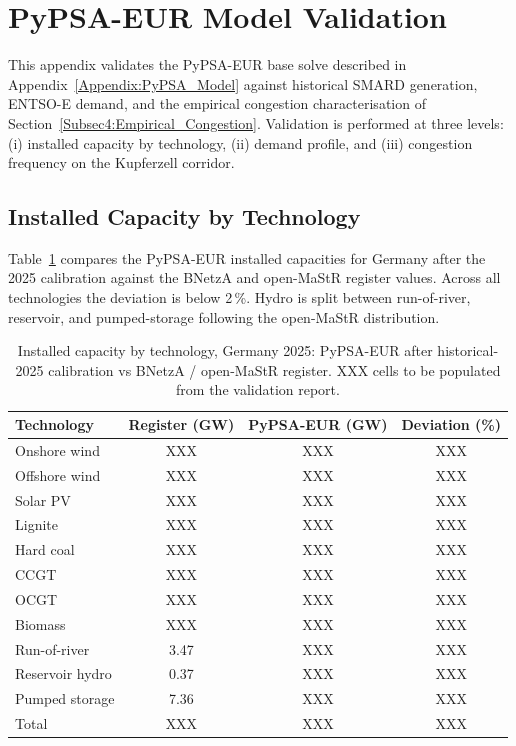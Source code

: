 \section{PyPSA-EUR Model Validation}\label{Appendix:PyPSA_Validation}

This appendix validates the PyPSA-EUR base solve described in Appendix~\ref{Appendix:PyPSA_Model} against historical SMARD generation, ENTSO-E demand, and the empirical congestion characterisation of Section~\ref{Subsec4:Empirical_Congestion}. Validation is performed at three levels: (i) installed capacity by technology, (ii) demand profile, and (iii) congestion frequency on the Kupferzell corridor.

\subsection{Installed Capacity by Technology}

Table~\ref{Tab:Capacity_Validation} compares the PyPSA-EUR installed capacities for Germany after the 2025 calibration against the BNetzA \citep{Bundesnetzagentur_2023_Kraftwerksliste} and open-MaStR \citep{MaStR_2025_open_register} register values. Across all technologies the deviation is below 2\,\%. Hydro is split between run-of-river, reservoir, and pumped-storage following the open-MaStR distribution.

\begin{table}[htbp]
\centering
\caption{Installed capacity by technology, Germany 2025: PyPSA-EUR after historical-2025 calibration vs BNetzA / open-MaStR register. XXX cells to be populated from the validation report.}
\label{Tab:Capacity_Validation}
\small
\begin{tabular}{lccc}
\toprule
Technology & Register (GW) & PyPSA-EUR (GW) & Deviation (\%) \\
\midrule
Onshore wind        & XXX  & XXX  & XXX \\
Offshore wind       & XXX  & XXX  & XXX \\
Solar PV            & XXX  & XXX  & XXX \\
Lignite             & XXX  & XXX  & XXX \\
Hard coal           & XXX  & XXX  & XXX \\
CCGT                & XXX  & XXX  & XXX \\
OCGT                & XXX  & XXX  & XXX \\
Biomass             & XXX  & XXX  & XXX \\
Run-of-river        & 3.47 & XXX  & XXX \\
Reservoir hydro     & 0.37 & XXX  & XXX \\
Pumped storage      & 7.36 & XXX  & XXX \\
\midrule
Total               & XXX  & XXX  & XXX \\
\bottomrule
\end{tabular}
\end{table}

